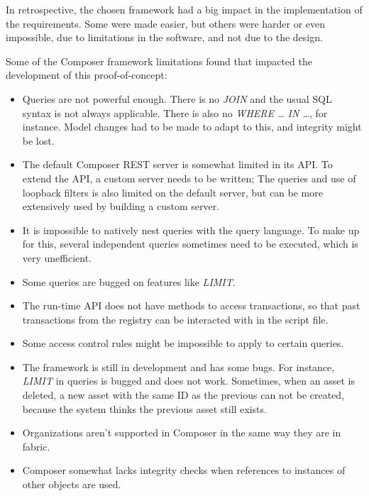 In retrospective, the chosen framework had a big impact in the implementation of the requirements. Some were made easier, but others were harder or even impossible, due to limitations in the software, and not due to the design.

Some of the Composer framework limitations found that impacted the development of this proof-of-concept:
\begin{itemize}
	\item  Queries are not powerful enough. There is no \textit{JOIN} and the usual SQL syntax is not always applicable. There is also no \textit{WHERE … IN …}, for instance. Model changes had to be made to adapt to this, and integrity might be lost.
	\item The default Composer REST server is somewhat limited in its API. To extend the API, a custom server needs to be written; The queries and use of loopback filters is also limited on the default server, but can be more extensively used by building a custom server.
	\item It is impossible to natively nest queries with the query language. To make up for this, several independent queries sometimes need to be executed, which is very unefficient.
	\item Some queries are bugged on features like \textit{LIMIT}.
	\item The run-time API does not have methods to access transactions, so that past transactions from the registry can be interacted with in the script file.
	\item Some access control rules might be impossible to apply to certain queries. 
	\item The framework is still in development and has some bugs. For instance, \textit{LIMIT} in queries is bugged and does not work. Sometimes, when an asset is deleted, a new asset with the same ID as the previous can not be created, because the system thinks the previous asset still exists.
	\item Organizations aren't supported in Composer in the same way they are in fabric.
	\item Composer somewhat lacks integrity checks when references to instances of other objects are used.
\end{itemize}
